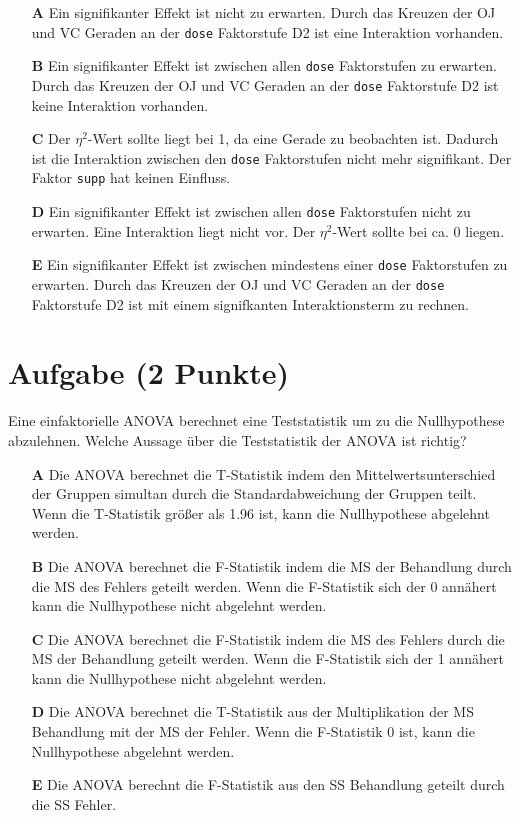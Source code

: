 \documentclass[a4paper, 10pt]{scrartcl}\usepackage[]{graphicx}\usepackage[]{color}
\begin{document}
\begin{enumerate}
\item [\textbf{A} \msquare] Ein signifikanter Effekt ist nicht zu erwarten. Durch das Kreuzen der OJ und VC Geraden an der \texttt{dose} Faktorstufe D2 ist eine Interaktion vorhanden.
\item [\textbf{B} \msquare] Ein signifikanter Effekt ist zwischen allen \texttt{dose} Faktorstufen zu erwarten. Durch das Kreuzen der OJ und VC Geraden an der \texttt{dose} Faktorstufe D2 ist keine Interaktion vorhanden.
\item [\textbf{C} \msquare] Der $\eta^2$-Wert sollte liegt bei 1, da eine Gerade zu beobachten ist. Dadurch ist die Interaktion zwischen den \texttt{dose} Faktorstufen nicht mehr signifikant. Der Faktor \texttt{supp} hat keinen Einfluss.
\item [\textbf{D} \msquare] Ein signifikanter Effekt ist zwischen allen \texttt{dose} Faktorstufen nicht zu erwarten. Eine Interaktion liegt nicht vor. Der $\eta^2$-Wert sollte bei ca. 0 liegen.
\item [\textbf{E} \msquare] Ein signifikanter Effekt ist zwischen mindestens einer \texttt{dose} Faktorstufen zu erwarten. Durch das Kreuzen der OJ und VC Geraden an der \texttt{dose} Faktorstufe D2 ist mit einem signifkanten Interaktionsterm zu rechnen.
\end{enumerate} 

\section{Aufgabe \hfill (2 Punkte)}

Eine einfaktorielle ANOVA berechnet eine Teststatistik um zu die Nullhypothese abzulehnen. Welche Aussage über die Teststatistik der ANOVA ist richtig?



\begin{enumerate}
\item [\textbf{A} \msquare] Die ANOVA berechnet die T-Statistik indem den Mittelwertsunterschied der Gruppen simultan durch die Standardabweichung der Gruppen teilt. Wenn die T-Statistik größer als 1.96 ist, kann die Nullhypothese abgelehnt werden.
\item [\textbf{B} \msquare] Die ANOVA berechnet die F-Statistik indem die MS der Behandlung durch die MS des Fehlers geteilt werden. Wenn die F-Statistik sich der 0 annähert kann die Nullhypothese nicht abgelehnt werden.
\item [\textbf{C} \msquare] Die ANOVA berechnet die F-Statistik indem die MS des Fehlers durch die MS der Behandlung geteilt werden. Wenn die F-Statistik sich der 1 annähert kann die Nullhypothese nicht abgelehnt werden.
\item [\textbf{D} \msquare] Die ANOVA berechnet die T-Statistik aus der Multiplikation der MS Behandlung mit der MS der Fehler. Wenn die F-Statistik 0 ist, kann die Nullhypothese abgelehnt werden.
\item [\textbf{E} \msquare] Die ANOVA berechnt die F-Statistik aus den SS Behandlung geteilt durch die SS Fehler.
\end{enumerate} 
\end{document}
